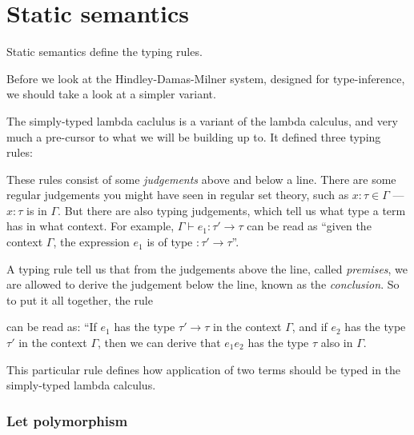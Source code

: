 \section{Static semantics}

Static semantics define the typing rules.

Before we look at the Hindley-Damas-Milner system, designed for
type-inference, we should take a look at a simpler variant.

The simply-typed lambda caclulus is a variant of the lambda
calculus, and very much a pre-cursor to what we will be building up
to. It defined three typing rules:
These rules consist of some \textit{judgements} above and below a line. There
are some regular judgements you might have seen in regular set theory,
such as $x : \tau \in \Gamma$ --- $x : \tau$ is in $\Gamma$. But there are also typing
judgements, which tell us what type a term has in what context. For
example, $\Gamma \vdash e_1 : \tau' \rightarrow \tau$ can be read as ``given the context
$\Gamma$, the expression $e_1$ is of type $:\tau' \rightarrow \tau$''.

A typing rule tell us that from the judgements above the line,
called \textit{premises}, we are allowed to derive the judgement
below the line, known as the \textit{conclusion}. So to put it all
together, the rule
\begin{mathpar}
\end{mathpar}
can be read as: ``If $e_1$ has the type $\tau' \rightarrow \tau$ in the context $\Gamma$,
and if $e_2$ has the type $\tau'$ in the context $\Gamma$, then we can derive
that $e_1 e_2$ has the type $\tau$ also in $\Gamma$.

This particular rule defines how application of two terms should be
typed in the simply-typed lambda calculus. 

\subsubsection{Let polymorphism}


